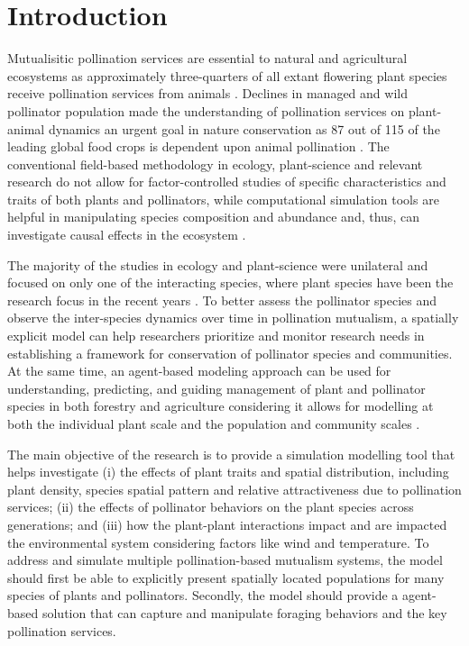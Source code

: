\documentclass[3p,,preprint,12pt]{elsarticle}
\begin{document}
\section{Introduction}
Mutualisitic pollination services are essential to natural and agricultural ecosystems as approximately three-quarters of all extant flowering plant species receive pollination services from animals \cite{NAP11761}. Declines in managed and wild pollinator population made the understanding of pollination services on plant-animal dynamics an urgent goal in nature conservation as 87 out of 115 of the leading global food crops is dependent upon animal pollination \cite{doi:10.1098/rspb.2006.3721}. The conventional field-based methodology in ecology, plant-science and relevant research do not allow for factor-controlled studies of specific characteristics and traits of both plants and pollinators, while computational simulation tools are helpful in manipulating species composition and abundance and, thus, can investigate causal effects in the ecosystem \cite{QU2013107}. 

The majority of the studies in ecology and plant-science were unilateral and focused on only one of the interacting species, where plant species have been the research focus in the recent years \cite{doi:10.1086/418432}. To better assess the pollinator species and observe the inter-species dynamics over time in pollination mutualism, a spatially explicit model can help researchers prioritize and monitor research needs in establishing a framework for conservation of pollinator species and communities. At the same time, an agent-based modeling approach can be used for understanding, predicting, and guiding management of plant and pollinator species in both forestry and agriculture considering it allows for modelling at both the individual plant scale and the population and community scales \cite{10.1093/aob/mcaa043}. 

The main objective of the research is to provide a simulation modelling tool that helps investigate (i) the effects of plant traits and spatial distribution, including plant density, species spatial pattern and relative attractiveness due to pollination services; (ii) the effects of pollinator behaviors on the plant species across generations; and (iii) how the plant-plant interactions impact and are impacted the environmental system considering factors like wind and temperature. To address and simulate multiple pollination-based mutualism systems, the model should first be able to explicitly present spatially located populations for many species of plants and pollinators. Secondly, the model should provide a agent-based solution that can capture and manipulate foraging behaviors and the key pollination services. 
\end{document}
